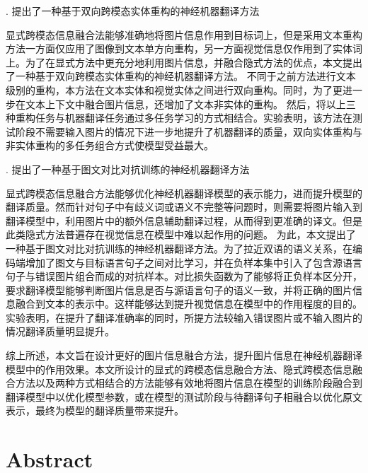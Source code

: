 {. 提出了一种基于双向跨模态实体重构的神经机器翻译方法}

显式跨模态信息融合法能够准确地将图片信息作用到目标词上，但是采用文本重构方法一方面仅应用了图像到文本单方向重构，另一方面视觉信息仅作用到了实体词上。为了在显式方法中更充分地利用图片信息，并融合隐式方法的优点，本文提出了一种基于双向跨模态实体重构的神经机器翻译方法。
不同于之前方法进行文本级别的重构，本方法在文本实体和视觉实体之间进行双向重构。同时，为了更进一步在文本上下文中融合图片信息，还增加了文本非实体的重构。%
然后，将以上三种重构任务与机器翻译任务通过多任务学习的方式相结合。实验表明，该方法在测试阶段不需要输入图片的情况下进一步地提升了机器翻译的质量，双向实体重构与非实体重构的多任务组合方式使模型受益最大。

{. 提出了一种基于图文对比对抗训练的神经机器翻译方法}

显式跨模态信息融合方法能够优化神经机器翻译模型的表示能力，进而提升模型的翻译质量。然而针对句子中有歧义词或语义不完整等问题时，则需要将图片输入到翻译模型中，利用图片中的额外信息辅助翻译过程，从而得到更准确的译文。但是此类隐式方法普遍存在视觉信息在模型中难以起作用的问题。
为此，本文提出了一种基于图文对比对抗训练的神经机器翻译方法。为了拉近双语的语义关系，在编码端增加了图文与目标语言句子之间对比学习，并在负样本集中引入了包含源语言句子与错误图片组合而成的对抗样本。对比损失函数为了能够将正负样本区分开，要求翻译模型能够判断图片信息是否与源语言句子的语义一致，并将正确的图片信息融合到文本的表示中。这样能够达到提升视觉信息在模型中的作用程度的目的。实验表明，在提升了翻译准确率的同时，所提方法较输入错误图片或不输入图片的情况翻译质量明显提升。

综上所述，本文旨在设计更好的图片信息融合方法，提升图片信息在神经机器翻译模型中的作用效果。本文所设计的显式的跨模态信息融合方法、隐式跨模态信息融合方法以及两种方式相结合的方法能够有效地将图片信息在模型的训练阶段融合到翻译模型中以优化模型参数，或在模型的测试阶段与待翻译句子相融合以优化原文表示，最终为模型的翻译质量带来提升。

\intobmk\chapter*{Abstract}%

